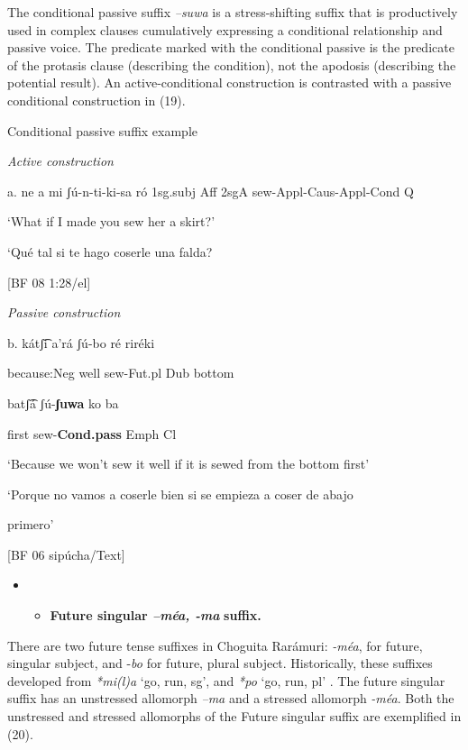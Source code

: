 The conditional passive suffix \textit{–suwa} is a stress-shifting suffix that is productively used in complex clauses cumulatively expressing a conditional relationship and passive voice. The predicate marked with the conditional passive is the predicate of the protasis clause (describing the condition), not the apodosis (describing the potential result). An active-conditional construction is contrasted with a passive conditional construction in (19).


   Conditional passive suffix example

    \textit{Active construction}

  a.  ne  a  mi  ʃú-n-ti-ki-sa      ró        1sg.subj  Aff  2sgA  sew-Appl-Caus-Appl-Cond  Q

  ‘What if I made you sew her a skirt?’

‘Qué tal si te hago coserle una falda?      

[BF 08 1:28/el]

    \textit{Passive construction}

b.    kátʃ͡i     a’rá   ʃú-bo    ré   riréki     

because:Neg  well  sew-Fut.pl  Dub  bottom

batʃ͡á   ʃú-\textbf{ʃuwa}     ko   ba

first  sew-\textbf{Cond.pass}  Emph  Cl

‘Because we won’t sew it well if it is sewed from the bottom first’

‘Porque no vamos a coserle bien si se empieza a coser de abajo 

 primero’            

[BF 06 sipúcha/Text]

\begin{itemize}
\item \begin{itemize}
\item \textbf{Future singular \textit{–méa, -ma} }\textbf{suffix.}
\end{itemize}
\end{itemize}

There are two future tense suffixes in Choguita Rarámuri: \textit{{}-méa}, for future, singular subject, and -\textit{bo} for future, plural subject. Historically, these suffixes developed from  \textit{*mi(l)a} ‘go, run, sg’, and \textit{*po} ‘go, run, pl’ \citep[133]{miller1996guarijio}. The future singular suffix has an unstressed allomorph \textit{–ma} and a stressed allomorph \textit{{}-méa}.  Both the unstressed and stressed allomorphs of the Future singular suffix are exemplified in (20).

